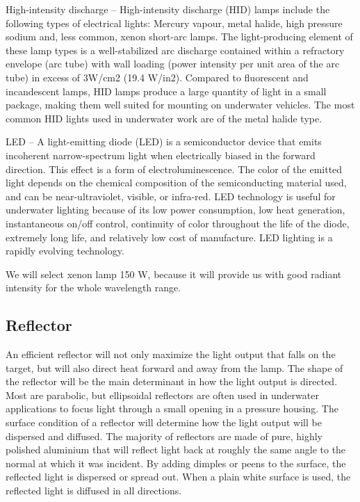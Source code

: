 High-intensity discharge – High-intensity discharge (HID) lamps include the
following types of electrical lights: Mercury vapour, metal halide, high pressure
sodium and, less common, xenon short-arc lamps. The light-producing
element of these lamp types is a well-stabilized arc discharge contained within
a refractory envelope (arc tube) with wall loading (power intensity per unit area
of the arc tube) in excess of 3W/cm2 (19.4 W/in2). Compared to fluorescent
and incandescent lamps, HID lamps produce a large quantity of light in a small
package, making them well suited for mounting on underwater vehicles. The
most common HID lights used in underwater work are of the metal halide type.

LED – A light-emitting diode (LED) is a semiconductor device that emits incoherent
narrow-spectrum light when electrically biased in the forward direction.
This effect is a form of electroluminescence. The color of the emitted light
depends on the chemical composition of the semiconducting material used,
and can be near-ultraviolet, visible, or infra-red. LED technology is useful for
underwater lighting because of its low power consumption, low heat generation,
instantaneous on/off control, continuity of color throughout the life of the diode,
extremely long life, and relatively low cost of manufacture. LED lighting is a
rapidly evolving technology.

We will select xenon lamp 150 W, because it will provide us with good radiant intensity for the whole wavelength range.

\subsection{Reflector}

An efficient reflector will not only maximize the light output that falls on the target,
but will also direct heat forward and away from the lamp. The shape of the reflector
will be the main determinant in how the light output is directed. Most are parabolic,
but ellipsoidal reflectors are often used in underwater applications to focus light
through a small opening in a pressure housing. The surface condition of a reflector
will determine how the light output will be dispersed and diffused. The majority of
reflectors are made of pure, highly polished aluminium that will reflect light back at
roughly the same angle to the normal at which it was incident. By adding dimples or
peens to the surface, the reflected light is dispersed or spread out. When a plain white surface is used, the reflected light is diffused in all directions.

